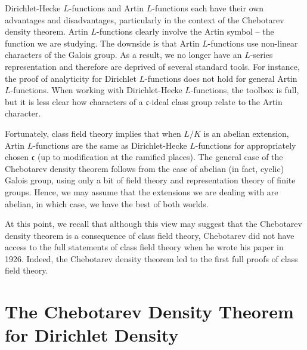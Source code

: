 \documentclass[12pt]{amsart}
\theoremstyle{definition}
\theoremstyle{remark}
\numberwithin{equation}{section}
\newcommand{\fkc}{\mathfrak c}
\begin{document}
Dirichlet-Hecke $L$-functions and Artin $L$-functions each have their own advantages and disadvantages, particularly in the context of the Chebotarev density theorem. Artin $L$-functions clearly involve the Artin symbol -- the function we are studying. The downside is that Artin $L$-functions use non-linear characters of the Galois group. As a result, we no longer have an $L$-series representation and therefore are deprived of several standard tools. For instance, the proof of analyticity for Dirichlet $L$-functions does not hold for general Artin $L$-functions. When working with Dirichlet-Hecke $L$-functions, the toolbox is full, but it is less clear how characters of a $\fkc$-ideal class group relate to the Artin character.

Fortunately, class field theory implies that when $L/K$ is an abelian extension, Artin $L$-functions are the same as Dirichlet-Hecke $L$-functions for appropriately chosen $\fkc$ (up to modification at the ramified places). The general case of the Chebotarev density theorem follows from the case of abelian (in fact, cyclic) Galois group, using only a bit of field theory and representation theory of finite groups. Hence, we may assume that the extensions we are dealing with are abelian, in which case, we have the best of both worlds.

At this point, we recall that although this view may suggest that the Chebotarev density theorem is a consequence of class field theory, Chebotarev did not have access to the full statements of class field theory when he wrote his paper \cite{Chebotarev26} in 1926. Indeed, the Chebotarev density theorem led to the first full proofs of class field theory. 



\section{The Chebotarev Density Theorem for Dirichlet Density} \label{sec:ChebForDD}
\end{document}
